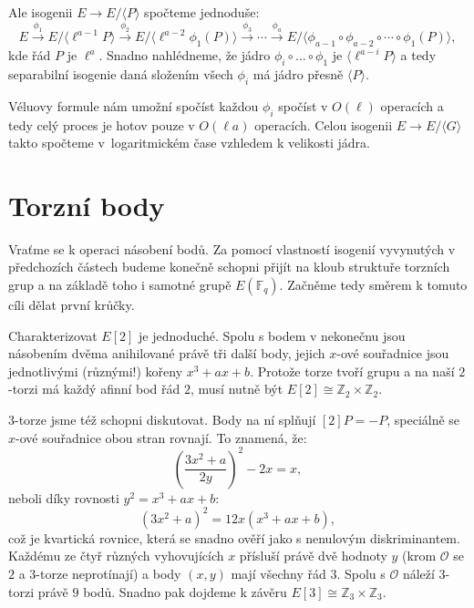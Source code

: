 \documentclass[12pt]{report}
\begin{document}
Ale isogenii $E \longrightarrow E/\langle P \rangle$ spočteme jednoduše:
\begin{equation*}
E \stackrel{\phi_1}{\longrightarrow} E/\langle \ell^{a-1} P \rangle \stackrel{\phi_2}{\longrightarrow}  E/\langle \ell^{a-2} \phi_1 (P) \rangle \stackrel{\phi_3}{\longrightarrow} \cdots \stackrel{\phi_{a}}{\longrightarrow} E/\langle \phi_{a-1} \circ \phi_{a-2} \circ \cdots \circ \phi_1 (P) \rangle,
\end{equation*}
kde řád $P$ je $\ell^a$. Snadno nahlédneme, že jádro $\phi_i \circ \dots \circ \phi_1$ je $\langle \ell^{a-i} P \rangle$ a tedy separabilní isogenie daná složením všech $\phi_i$ má jádro přesně $\langle P \rangle$.

Véluovy formule nám umožní spočíst každou $\phi_i$ spočíst v $O(\ell)$ operacích a tedy celý proces je hotov pouze v $O(\ell a)$ operacích. Celou isogenii $E \longrightarrow E/\langle G \rangle$ takto spočteme v~logaritmickém čase vzhledem k velikosti jádra.

\section{Torzní body}

Vraťme se k operaci násobení bodů. Za pomocí vlastností isogenií vyvynutých v předchozích částech budeme konečně schopni přijít na kloub struktuře torzních grup a na základě toho i samotné grupě $E(\mathbb{F}_q)$. Začněme tedy směrem k tomuto cíli dělat první krůčky.

Charakterizovat $E[2]$ je jednoduché. Spolu s bodem v nekonečnu jsou násobením dvěma anihilované právě tři další body, jejich $x$-ové souřadnice jsou jednotlivými (různými!) kořeny $x^3+ax+b$. Protože torze tvoří grupu a na naší $2$-torzi má každý afinní bod řád $2$, musí nutně být $E[2] \cong \mathbb{Z}_2 \times \mathbb{Z}_2$.

$3$-torze jsme též schopni diskutovat. Body na ní splňují $[2]P = -P$, speciálně se $x$-ové souřadnice obou stran rovnají. To znamená, že:
\begin{equation*}
\left(\frac{3x^2+a}{2y}\right)^2 -2x = x,
\end{equation*}
neboli díky rovnosti $y^2 = x^3+ax+b$:
\begin{equation*}
(3x^2+a)^2 = 12x(x^3+ax+b),
\end{equation*}
což je kvartická rovnice, která se snadno ověří jako s nenulovým diskriminantem. Každému ze čtyř různých vyhovujících $x$ přísluší právě dvě hodnoty $y$ (krom $\mathcal{O}$ se $2$ a $3$-torze neprotínají) a body $(x,y)$ mají všechny řád $3$. Spolu s $\mathcal{O}$ náleží $3$-torzi právě $9$ bodů. Snadno pak dojdeme k závěru $E[3] \cong \mathbb{Z}_3 \times \mathbb{Z}_3$.
\end{document}
